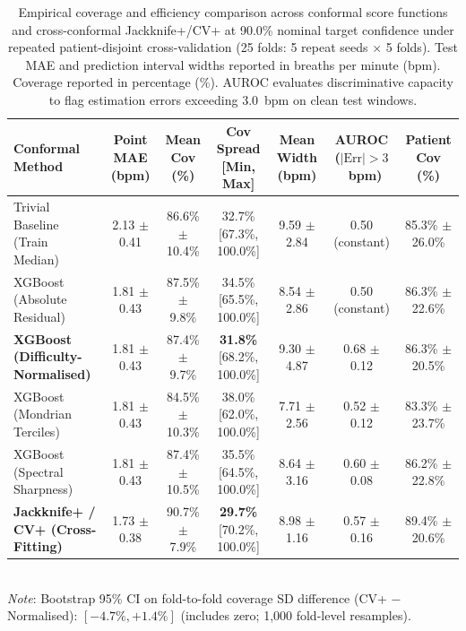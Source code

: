 \begin{table}[htbp]
\centering
\caption{Empirical coverage and efficiency comparison across conformal score functions and cross-conformal Jackknife+/CV+ at 90.0\% nominal target confidence under repeated patient-disjoint cross-validation (25 folds: 5 repeat seeds $\times$ 5 folds). Test MAE and prediction interval widths reported in breaths per minute (bpm). Coverage reported in percentage (\%). AUROC evaluates discriminative capacity to flag estimation errors exceeding 3.0~bpm on clean test windows.}
\label{tab:conformal_scores}
\begin{tabular}{lcccccc}
\toprule
\textbf{Conformal Method} & \textbf{Point MAE (bpm)} & \textbf{Mean Cov (\%)} & \textbf{Cov Spread [Min, Max]} & \textbf{Mean Width (bpm)} & \textbf{AUROC ($|\text{Err}| > 3$~bpm)} & \textbf{Patient Cov (\%)} \\
\midrule
Trivial Baseline (Train Median) & 2.13 $\pm$ 0.41 & 86.6\% $\pm$ 10.4\% & 32.7\% [67.3\%, 100.0\%] & 9.59 $\pm$ 2.84 & 0.50 (constant) & 85.3\% $\pm$ 26.0\% \\
XGBoost (Absolute Residual) & 1.81 $\pm$ 0.43 & 87.5\% $\pm$ 9.8\% & 34.5\% [65.5\%, 100.0\%] & 8.54 $\pm$ 2.86 & 0.50 (constant) & 86.3\% $\pm$ 22.6\% \\
\textbf{XGBoost (Difficulty-Normalised)} & 1.81 $\pm$ 0.43 & 87.4\% $\pm$ 9.7\% & \textbf{31.8\%} [68.2\%, 100.0\%] & 9.30 $\pm$ 4.87 & 0.68 $\pm$ 0.12 & 86.3\% $\pm$ 20.5\% \\
XGBoost (Mondrian Terciles) & 1.81 $\pm$ 0.43 & 84.5\% $\pm$ 10.3\% & 38.0\% [62.0\%, 100.0\%] & 7.71 $\pm$ 2.56 & 0.52 $\pm$ 0.12 & 83.3\% $\pm$ 23.7\% \\
XGBoost (Spectral Sharpness) & 1.81 $\pm$ 0.43 & 87.4\% $\pm$ 10.5\% & 35.5\% [64.5\%, 100.0\%] & 8.64 $\pm$ 3.16 & 0.60 $\pm$ 0.08 & 86.2\% $\pm$ 22.8\% \\
\textbf{Jackknife+ / CV+ (Cross-Fitting)} & 1.73 $\pm$ 0.38 & 90.7\% $\pm$ 7.9\% & \textbf{29.7\%} [70.2\%, 100.0\%] & 8.98 $\pm$ 1.16 & 0.57 $\pm$ 0.16 & 89.4\% $\pm$ 20.6\% \\
\bottomrule
\end{tabular}
\vspace{1mm}\\
\footnotesize{\textit{Note}: Bootstrap 95\% CI on fold-to-fold coverage SD difference (CV+ $-$ Normalised): $[-4.7\%, +1.4\%]$ (includes zero; 1,000 fold-level resamples).}
\end{table}



